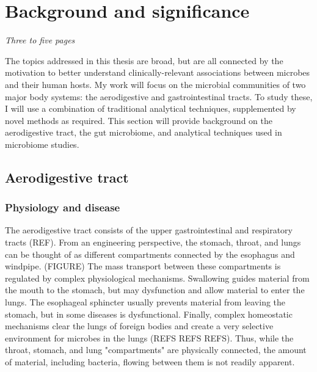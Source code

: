 \documentclass[12pt]{article}
\begin{document}
\section{Background and significance}
\textit{Three to five pages}

The topics addressed in this thesis are broad, but are all connected by
the motivation to better understand
clinically-relevant associations between microbes and their human hosts.
My work will focus on the microbial communities of two major body systems:
the aerodigestive and gastrointestinal tracts. To study these, I will 
use a combination of traditional analytical techniques, supplemented by 
novel methods as required. This section will provide background on
the aerodigestive tract, the gut microbiome, and analytical techniques 
used in microbiome studies. 

\subsection{Aerodigestive tract}

\subsubsection{Physiology and disease}
The aerodigestive tract consists of the upper gastrointestinal and 
respiratory tracts (REF). From an engineering perspective, the 
stomach, throat, and lungs can be thought of as different compartments 
connected by the esophagus and windpipe. (FIGURE) The mass transport 
between these compartments is regulated by complex physiological 
mechanisms. Swallowing guides material from the mouth to the stomach, 
but may dysfunction and allow material to enter the lungs. The 
esophageal sphincter usually prevents material from leaving the 
stomach, but in some diseases is dysfunctional. Finally, complex 
homeostatic mechanisms clear the lungs of foreign bodies and create a 
very selective environment for microbes in the lungs (REFS REFS REFS). 
Thus, while the throat, stomach, and lung "compartments" are 
physically connected, the amount of material, including bacteria, 
flowing between them is not readily apparent. 
\end{document}
